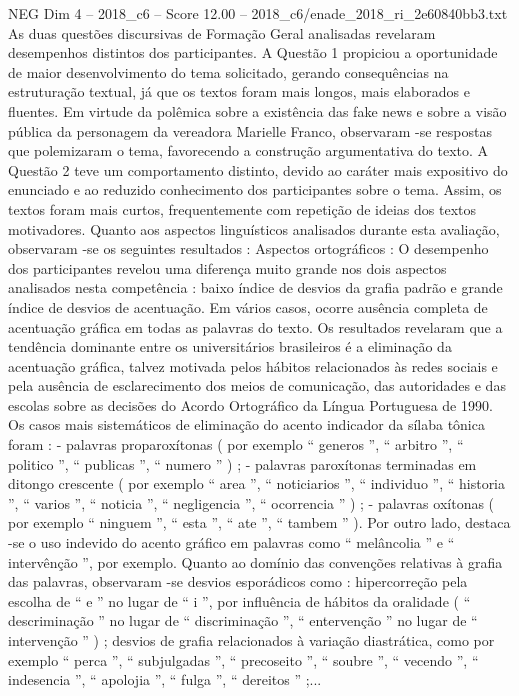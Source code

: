 \begin{textsample}{NEG Dim 4 – 2018\_c6 – Score 12.00 – 2018\_c6/enade\_2018\_ri\_2e60840bb3.txt}
As duas questões discursivas de Formação Geral analisadas revelaram desempenhos distintos dos participantes.
A Questão 1 propiciou a oportunidade de maior desenvolvimento do tema solicitado, gerando consequências na estruturação textual, já que os textos foram mais longos, mais elaborados e fluentes.
Em virtude da polêmica sobre a existência das fake news e sobre a visão pública da personagem da vereadora Marielle Franco, observaram -se respostas que polemizaram o tema, favorecendo a construção argumentativa do texto.
A Questão 2 teve um comportamento distinto, devido ao caráter mais expositivo do enunciado e ao reduzido conhecimento dos participantes sobre o tema.
Assim, os textos foram mais curtos, frequentemente com repetição de ideias dos textos motivadores.
Quanto aos aspectos linguísticos analisados durante esta avaliação, observaram -se os seguintes resultados : Aspectos ortográficos : O desempenho dos participantes revelou uma diferença muito grande nos dois aspectos analisados nesta competência : baixo índice de desvios da grafia padrão e grande índice de desvios de acentuação.
Em vários casos, ocorre ausência completa de acentuação gráfica em todas as palavras do texto.
Os resultados revelaram que a tendência dominante entre os universitários brasileiros é a eliminação da acentuação gráfica, talvez motivada pelos hábitos relacionados às redes sociais e pela ausência de esclarecimento dos meios de comunicação, das autoridades e das escolas sobre as decisões do Acordo Ortográfico da Língua Portuguesa de 1990.
Os casos mais sistemáticos de eliminação do acento indicador da sílaba tônica foram : - palavras proparoxítonas ( por exemplo “ generos ”, “ arbitro ”, “ politico ”, “ publicas ”, “ numero ” ) ; - palavras paroxítonas terminadas em ditongo crescente ( por exemplo “ area ”, “ noticiarios ”, “ individuo ”, “ historia ”, “ varios ”, “ noticia ”, “ negligencia ”, “ ocorrencia ” ) ; - palavras oxítonas ( por exemplo “ ninguem ”, “ esta ”, “ ate ”, “ tambem ” ).
Por outro lado, destaca -se o uso indevido do acento gráfico em palavras como “ melâncolia ” e “ intervênção ”, por exemplo.
Quanto ao domínio das convenções relativas à grafia das palavras, observaram -se desvios esporádicos como : hipercorreção pela escolha de “ e ” no lugar de “ i ”, por influência de hábitos da oralidade ( “ descriminação ” no lugar de “ discriminação ”, “ entervenção ” no lugar de “ intervenção ” ) ; desvios de grafia relacionados à variação diastrática, como por exemplo “ perca ”, “ subjulgadas ”, “ precoseito ”, “ soubre ”, “ vecendo ”, “ indesencia ”, “ apolojia ”, “ fulga ”, “ dereitos ” ;...

\end{textsample}
